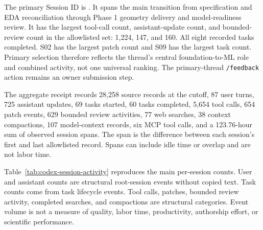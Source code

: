 \documentclass[11pt]{article}
\begin{document}
The primary Session ID is . It spans the main transition from specification and EDA reconciliation through Phase 1 geometry delivery and model-readiness review. It has the largest tool-call count, assistant-update count, and bounded-review count in the allowlisted set: 1,224, 147, and 160. All eight recorded tasks completed. S02 has the largest patch count and S09 has the largest task count. Primary selection therefore reflects the thread's central foundation-to-ML role and combined activity, not one universal ranking. The primary-thread \texttt{/feedback} action remains an owner submission step.

The aggregate receipt records 28,258 source records at the cutoff, 87 user turns, 725 assistant updates, 69 tasks started, 60 tasks completed, 5,654 tool calls, 654 patch events, 629 bounded review activities, 77 web searches, 38 context compactions, 107 model-context records, six MCP tool calls, and a 123.76-hour sum of observed session spans. The span is the difference between each session's first and last allowlisted record. Spans can include idle time or overlap and are not labor time.

Table~\ref{tab:codex-session-activity} reproduces the main per-session counts. User and assistant counts are structural root-session events without copied text. Task counts come from task lifecycle events. Tool calls, patches, bounded review activity, completed searches, and compactions are structural categories. Event volume is not a measure of quality, labor time, productivity, authorship effort, or scientific performance.
\end{document}
